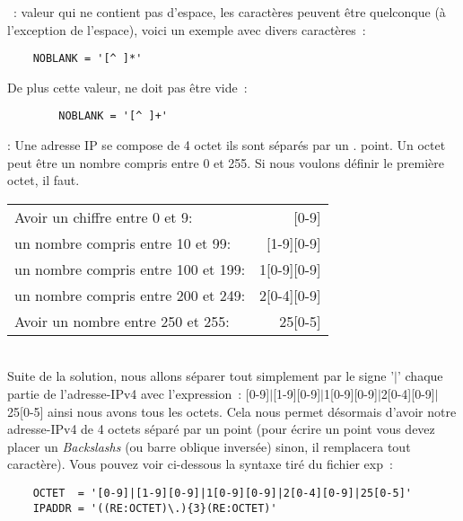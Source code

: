 ~: valeur qui ne contient pas d'espace, les caractères peuvent être
quelconque (à l'exception de l'espace), voici un exemple avec divers caractères~:

\begin{example}
\begin{verbatim}
    NOBLANK = '[^ ]*'
\end{verbatim}
\end{example}

De plus cette valeur, ne doit pas être vide~:

\begin{example}
\begin{verbatim}
        NOBLANK = '[^ ]+'
\end{verbatim}
\end{example}

: Une adresse IP se compose de 4 octet ils sont séparés par un \og{}.\fg{} point. Un octet
peut être un nombre compris entre 0 et 255. Si nous voulons définir le première
octet, il faut.\\

\begin{tabular}[ht!]{lr}
  Avoir un chiffre entre 0 et 9: &       [0-9]\\
  un nombre compris entre 10 et 99: &     [1-9][0-9]\\
  un nombre compris entre 100 et 199:&   1[0-9][0-9]\\
  un nombre compris entre 200 et 249: &  2[0-4][0-9]\\
  Avoir un nombre entre 250 et 255: & 25[0-5]\\
\end{tabular}\\

Suite de la solution, nous allons séparer tout simplement par le signe '$|$'
chaque partie de l'adresse-IPv4 avec l'expression~:
\og{}[0-9]$|$[1-9][0-9]$|$1[0-9][0-9]$|$2[0-4][0-9]$|$25[0-5]\fg{} ainsi nous avons
tous les octets. Cela nous permet désormais d'avoir notre adresse-IPv4 de 4 octets
séparé par un point (pour écrire un point vous devez placer un \emph{Backslashs}
(ou barre oblique inversée) sinon, il remplacera tout caractère). Vous pouvez voir
ci-dessous la syntaxe tiré du fichier exp~:

\begin{example}
\begin{verbatim}
    OCTET  = '[0-9]|[1-9][0-9]|1[0-9][0-9]|2[0-4][0-9]|25[0-5]'
    IPADDR = '((RE:OCTET)\.){3}(RE:OCTET)'
\end{verbatim}
\end{example}


